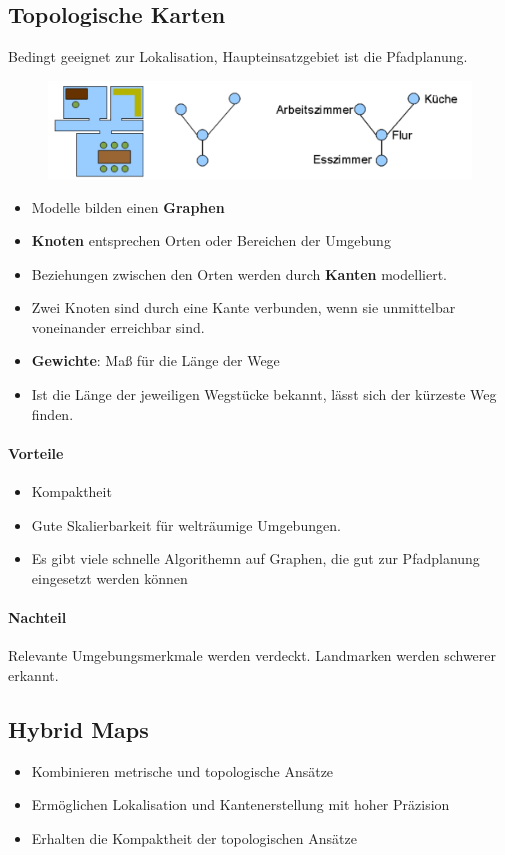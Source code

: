 \subsection{Topologische Karten}
Bedingt geeignet zur Lokalisation, Haupteinsatzgebiet ist die Pfadplanung.
\begin{figure}[H]
	\begin{center}
		\includegraphics[scale=0.42]{Resources/PNG/TopologischeKarte.PNG}
		\caption{}
		\label{fig:PNG/TopologischeKarte.PNG}
	\end{center}
\end{figure}
\begin{itemize}
	\item Modelle bilden einen \textbf{Graphen}
	\item \textbf{Knoten} entsprechen Orten oder Bereichen der Umgebung
	\item Beziehungen zwischen den Orten werden durch \textbf{Kanten} modelliert.
	\item Zwei Knoten sind durch eine Kante verbunden, wenn sie unmittelbar voneinander erreichbar sind.
	\item \textbf{Gewichte}: Maß für die Länge der Wege
	\item Ist die Länge der jeweiligen Wegstücke bekannt, lässt sich der kürzeste Weg finden.
\end{itemize}
\paragraph{Vorteile}
\begin{itemize}
	\item Kompaktheit
	\item Gute Skalierbarkeit für welträumige Umgebungen.
	\item Es gibt viele schnelle Algorithemn auf Graphen, die gut zur Pfadplanung eingesetzt werden können
\end{itemize}
\paragraph{Nachteil} Relevante Umgebungsmerkmale werden verdeckt. Landmarken werden schwerer erkannt.
\subsection{Hybrid Maps}
\begin{itemize}
	\item Kombinieren metrische und topologische Ansätze
	\item Ermöglichen Lokalisation und Kantenerstellung mit hoher Präzision
	\item Erhalten die Kompaktheit der topologischen Ansätze
\end{itemize}
